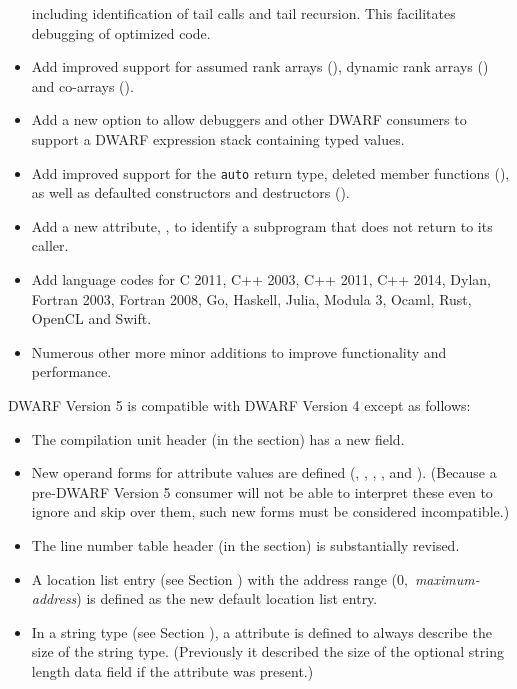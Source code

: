 \begin{itemize}
including identification of tail calls and tail recursion.
This facilitates debugging of optimized code.
\item Add improved support for  assumed rank arrays 
(\DWTAGgenericsubrangeNAME), dynamic rank arrays (\DWATrankNAME)
and co-arrays (\DWTAGcoarraytypeNAME{}).
\item Add a new option to allow debuggers and other DWARF consumers to
support a DWARF expression stack containing typed values.
\item Add improved support for the  \texttt{auto}
return type, deleted member functions (\DWATdeletedNAME), as well as defaulted 
constructors and destructors (\DWATdefaultedNAME).
\item Add a new attribute, \DWATnoreturnNAME{}, to identify 
a subprogram that does not return to its caller.
\item Add language codes for C 2011, C++ 2003, C++ 2011, C++ 2014,
Dylan, Fortran 2003, Fortran 2008, Go, Haskell, 
Julia, Modula 3, Ocaml, Rust, OpenCL and Swift.
\item Numerous other more minor additions to improve functionality
and performance.
\end{itemize}

DWARF Version 5 is compatible with DWARF Version 4 except as follows:
\begin{itemize}
\item The compilation unit header (in the \dotdebuginfo{} section) has
a new \HFNunittype{} field.
\item New operand forms for attribute values are defined 
(\DWFORMaddrxNAME, \DWFORMdatasixteenNAME, \DWFORMlinestrpNAME, 
\DWFORMrefsupNAME, \DWFORMstrpsupNAME{} and \DWFORMstrxNAME).
(Because a pre-DWARF Version 5 consumer will not be able to interpret 
these even to ignore and skip over them, such new forms must be 
considered incompatible.)
\item The line number table header (in the \dotdebugline{} section) 
is substantially revised.
\item A location list entry (see Section ) 
with the address range \mbox{(0, \textit{maximum-address})} is defined 
as the new default location list entry.
\item In a string type (see Section ), 
a \DWATbytesizeNAME{} attribute is defined to always describe the size 
of the string type. (Previously
it described the size of the optional string length data field if the 
\DWATstringlengthNAME{} attribute was present.)
\end{itemize}

